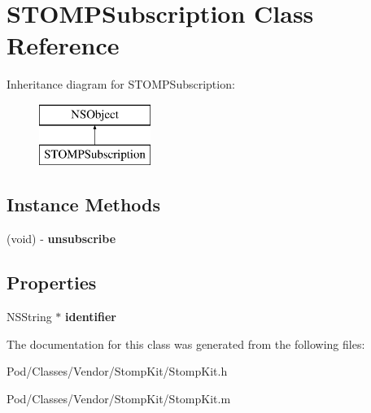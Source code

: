 \hypertarget{interface_s_t_o_m_p_subscription}{}\section{S\+T\+O\+M\+P\+Subscription Class Reference}
\label{interface_s_t_o_m_p_subscription}
Inheritance diagram for S\+T\+O\+M\+P\+Subscription\+:\begin{figure}[H]
\begin{center}
\leavevmode
\includegraphics[height=2.000000cm]{interface_s_t_o_m_p_subscription}
\end{center}
\end{figure}
\subsection*{Instance Methods}
\begin{DoxyCompactItemize}
\item 
(void) -\/ {\bfseries unsubscribe}\hypertarget{interface_s_t_o_m_p_subscription_a8fa1d32c5c5e032090108f9a75b11d18}{}\label{interface_s_t_o_m_p_subscription_a8fa1d32c5c5e032090108f9a75b11d18}

\end{DoxyCompactItemize}
\subsection*{Properties}
\begin{DoxyCompactItemize}
\item 
N\+S\+String $\ast$ {\bfseries identifier}\hypertarget{interface_s_t_o_m_p_subscription_ad3b4b42d3b01621cee7d77ff96cede80}{}\label{interface_s_t_o_m_p_subscription_ad3b4b42d3b01621cee7d77ff96cede80}

\end{DoxyCompactItemize}


The documentation for this class was generated from the following files\+:\begin{DoxyCompactItemize}
\item 
Pod/\+Classes/\+Vendor/\+Stomp\+Kit/Stomp\+Kit.\+h\item 
Pod/\+Classes/\+Vendor/\+Stomp\+Kit/Stomp\+Kit.\+m\end{DoxyCompactItemize}
